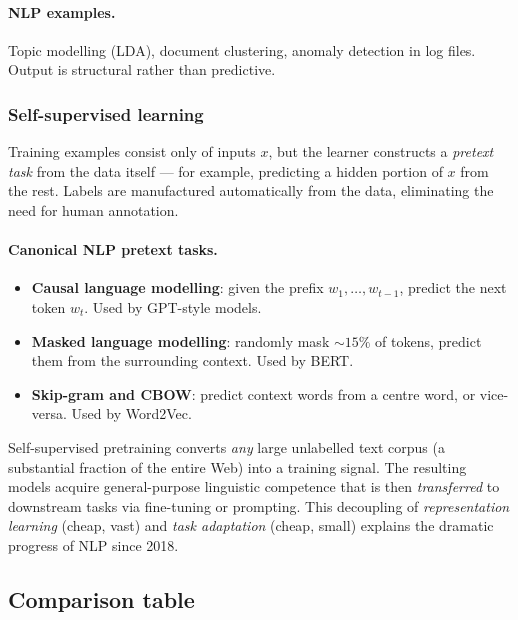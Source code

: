 \paragraph{NLP examples.} Topic modelling (LDA), document clustering, anomaly detection in log files. Output is structural rather than predictive.

\subsubsection*{Self-supervised learning}

\begin{definition}
Training examples consist only of inputs $x$, but the learner constructs a \emph{pretext task} from the data itself --- for example, predicting a hidden portion of $x$ from the rest. Labels are manufactured automatically from the data, eliminating the need for human annotation.
\end{definition}

\paragraph{Canonical NLP pretext tasks.}
\begin{itemize}
    \item \textbf{Causal language modelling}: given the prefix $w_1, \dots, w_{t-1}$, predict the next token $w_t$. Used by GPT-style models.
    \item \textbf{Masked language modelling}: randomly mask $\sim 15\%$ of tokens, predict them from the surrounding context. Used by BERT.
    \item \textbf{Skip-gram and CBOW}: predict context words from a centre word, or vice-versa. Used by Word2Vec.
\end{itemize}

\begin{remark}
Self-supervised pretraining converts \emph{any} large unlabelled text corpus (a substantial fraction of the entire Web) into a training signal. The resulting models acquire general-purpose linguistic competence that is then \emph{transferred} to downstream tasks via fine-tuning or prompting. This decoupling of \emph{representation learning} (cheap, vast) and \emph{task adaptation} (cheap, small) explains the dramatic progress of NLP since 2018.
\end{remark}

\subsection{Comparison table}

